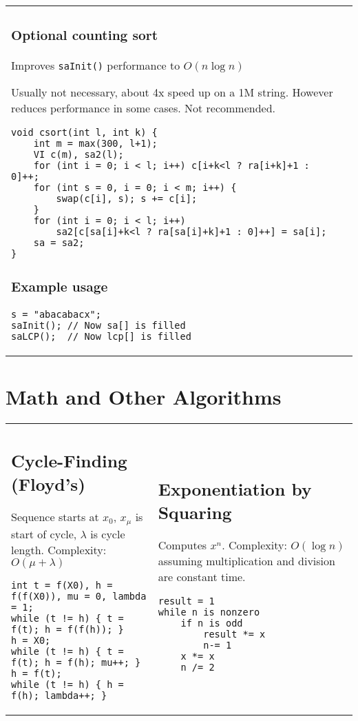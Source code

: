 \documentclass[letterpaper]{article}
\begin{document}
\begin{tabular}{@{}p{9cm}p{9cm}@{}}
\subsubsection{Optional counting sort}
Improves \texttt{saInit()} performance to $O\left(n\log n\right)$

Usually not necessary, about 4x speed up on a 1M string. However reduces performance in some cases. Not recommended.
\begin{lstlisting}
void csort(int l, int k) {
	int m = max(300, l+1);
	VI c(m), sa2(l);
	for (int i = 0; i < l; i++) c[i+k<l ? ra[i+k]+1 : 0]++;
	for (int s = 0, i = 0; i < m; i++) {
		swap(c[i], s); s += c[i];
	}
	for (int i = 0; i < l; i++)
		sa2[c[sa[i]+k<l ? ra[sa[i]+k]+1 : 0]++] = sa[i];
	sa = sa2;
}
\end{lstlisting}
\subsubsection{Example usage}

\begin{lstlisting}
s = "abacabacx";
saInit(); // Now sa[] is filled
saLCP();  // Now lcp[] is filled
\end{lstlisting}

\end{tabular}

\clearpage

\section{Math and Other Algorithms}

\begin{tabular}{@{}p{9cm}p{9cm}@{}}
\subsection{Cycle-Finding (Floyd's)}

Sequence starts at $x_0$, $x_\mu$ is start of cycle, $\lambda$ is cycle length. Complexity: $O\left(\mu+\lambda\right)$

\begin{lstlisting}
int t = f(X0), h = f(f(X0)), mu = 0, lambda = 1;
while (t != h) { t = f(t); h = f(f(h)); }
h = X0;
while (t != h) { t = f(t); h = f(h); mu++; }
h = f(t);
while (t != h) { h = f(h); lambda++; }
\end{lstlisting}
&
\subsection{Exponentiation by Squaring}

Computes $x^n$. Complexity: $O\left(\log n\right)$ assuming multiplication and division are constant time.

\begin{lstlisting}
result = 1
while n is nonzero
	if n is odd
		result *= x
		n-= 1
	x *= x
	n /= 2
\end{lstlisting}
\end{tabular}
\end{document}
